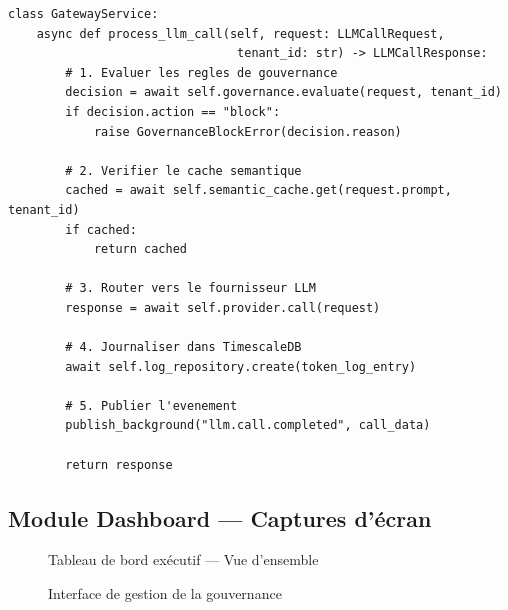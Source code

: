\begin{lstlisting}[language=Python3, caption={Flux simplifié du Gateway (modules/gateway/services/gateway\_service.py)}]
class GatewayService:
    async def process_llm_call(self, request: LLMCallRequest, 
                                tenant_id: str) -> LLMCallResponse:
        # 1. Evaluer les regles de gouvernance
        decision = await self.governance.evaluate(request, tenant_id)
        if decision.action == "block":
            raise GovernanceBlockError(decision.reason)
        
        # 2. Verifier le cache semantique
        cached = await self.semantic_cache.get(request.prompt, tenant_id)
        if cached:
            return cached
        
        # 3. Router vers le fournisseur LLM
        response = await self.provider.call(request)
        
        # 4. Journaliser dans TimescaleDB
        await self.log_repository.create(token_log_entry)
        
        # 5. Publier l'evenement
        publish_background("llm.call.completed", call_data)
        
        return response
\end{lstlisting}

\subsection{Module Dashboard --- Captures d'écran}

\begin{figure}[H]
    \centering
    \caption{Tableau de bord exécutif --- Vue d'ensemble}
    \label{fig:dashboard_exec}
\end{figure}

\begin{figure}[H]
    \centering
    \caption{Interface de gestion de la gouvernance}
    \label{fig:governance_ui}
\end{figure}

